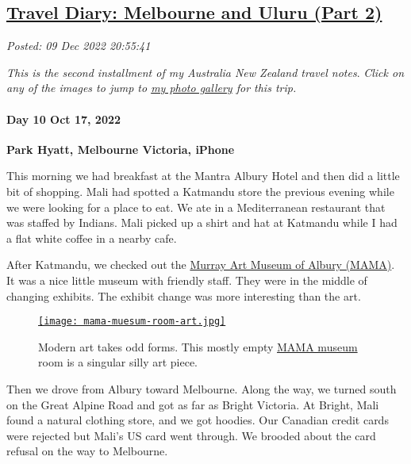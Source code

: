 %

\subsection*{\href{http://analyzethedatanotthedrivel.org/2022/12/09/travel-diary-melbourne-and-uluru-part-2/}{Travel Diary: Melbourne and Uluru (Part 2)}}


\noindent\emph{Posted: 09 Dec 2022 20:55:41}
\vspace{6pt}

\emph{This is the second installment of my Australia New Zealand travel
notes}. \emph{Click on any of the images to jump to
\href{https://conceptcontrol.smugmug.com/Trips/Overseas/Australia-New-Zealand-2022/}{my
photo gallery} for this trip.}


\hypertarget{day-10-oct-17-2022}{%
\paragraph{\texorpdfstring{\textbf{Day 10 Oct 17, 
2022}}{Day 10 Oct 17, 2022}}\label{day-10-oct-17-2022}}

\textbf{Park Hyatt, Melbourne Victoria, iPhone}

This morning we had breakfast at the Mantra Albury Hotel and then did a
little bit of shopping. Mali had spotted a Katmandu store the previous
evening while we were looking for a place to eat. We ate in a Mediterranean 
restaurant that was staffed by Indians. Mali picked up a
shirt and hat at Katmandu while I had a flat white coffee in a nearby
cafe.

After Katmandu, we checked out the
\href{https://www.mamalbury.com.au/}{Murray Art Museum of Albury
(MAMA)}. It was a nice little museum with friendly staff. They were in
the middle of changing exhibits. The exhibit change was more interesting
than the art.

\captionsetup[figure]{labelformat=empty}
\begin{SCfigure}
\centering
\href{https://conceptcontrol.smugmug.com/Trips/Overseas/Australia-New-Zealand-2022/i-Z5hXNjd/A}{\texttt{[image: mama-muesum-room-art.jpg]}}
\caption[MAMA Art museum room]{Modern art takes odd forms. This mostly empty \href{https://www.mamalbury.com.au/}{MAMA museum} room
is a singular silly art piece.}
\label{fig:7573x0}
\end{SCfigure}

Then we drove from Albury toward Melbourne. Along the way, we turned
south on the Great Alpine Road and got as far as Bright Victoria. At
Bright, Mali found a natural clothing store, and we got hoodies. Our
Canadian credit cards were rejected but Mali's US card went through. We
brooded about the card refusal on the way to Melbourne.

